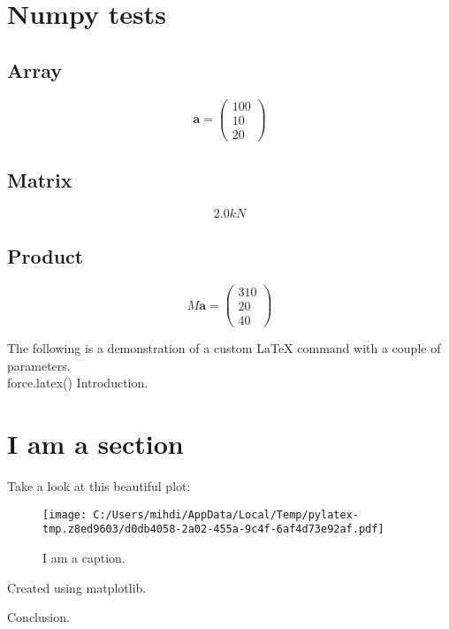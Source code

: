 \documentclass{article}%
\begin{document}
%
\normalsize%
\section{Numpy tests}%
\label{sec:Numpytests}%
\subsection{Array}%
\label{subsec:Array}%
\[%
\mathbf{a} = \begin{pmatrix}%
100\\%
10\\%
20%
\end{pmatrix}%
\]

%
\subsection{Matrix}%
\label{subsec:Matrix}%
\[%
2.0  kN%
\]

%
\subsection{Product}%
\label{subsec:Product}%
\[%
M \mathbf{a} = \begin{pmatrix}%
310\\%
20\\%
40%
\end{pmatrix}%
\]

%

        The following is a demonstration of a custom \LaTeX{}
        command with a couple of parameters.\\
        force.latex()
Introduction.%
\section{I am a section}%
\label{sec:Iamasection}%
Take a look at this beautiful plot:%


\begin{figure}[h]%
\centering%
\texttt{[image: C:/Users/mihdi/AppData/Local/Temp/pylatex-tmp.z8ed9603/d0db4058-2a02-455a-9c4f-6af4d73e92af.pdf]}%
\caption{I am a caption.}%
\end{figure}

%
Created using matplotlib.

%
Conclusion.%
\end{document}
